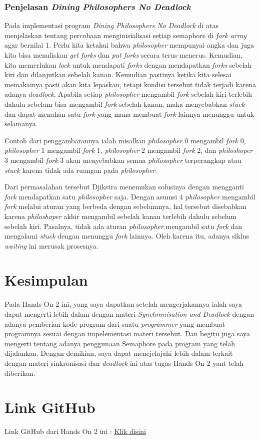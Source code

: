 \documentclass[11pt,a4paper]{article}
\begin{document}
\subsubsection{Penjelasan \textit{Dining Philosophers No Deadlock}}
Pada implementasi program \textit{Dining Philosophers No Deadlock} di atas menjelaskan tentang percobaan menginisialisasi setiap semaphore di \textit{fork array} agar bernilai 1.
Perlu kita ketahui bahwa \textit{philosopher} mempunyai angka dan juga kita bisa menuliskan \textit{get forks} dan \textit{put forks} secara terus-menerus. Kemudian, kita memerlukan 
\textit{lock} untuk mendapati \textit{forks} dengan mendapatkan \textit{forks} sebelah kiri dan dilanjutkan sebelah kanan. Kemudian pastinya ketika kita selesai memakainya pasti akan kita 
lepaskan, tetapi kondisi tersebut tidak terjadi karena adanya \textit{deadlock}. Apabila setiap \textit{philosopher} mengambil \textit{fork} sebelah kiri terlebih dahulu sebelum bisa mengambil 
\textit{fork} sebelah kanan, maka menyebabkan \textit{stuck} dan dapat menahan satu \textit{fork} yang mana membuat \textit{fork} lainnya menunggu untuk selamanya. \par
Contoh dari penggambarannya ialah misalkan \textit{philosopher} 0 mengambil \textit{fork} 0, \textit{philosopher} 1 mengambil \textit{fork} 1, \textit{philosopher} 2 mengambil \textit{fork} 2, dan 
\textit{philoshoper} 3 mengambil \textit{fork} 3 akan menyebabkan semua \textit{philosopher} terperangkap atau \textit{stuck} karena tidak ada ruangan pada \textit{philosopher}. \par
Dari permasalahan tersebut Djikstra menemukan solusinya dengan mengganti \textit{fork} mendapatkan satu \textit{philosopher} saja. Dengan asumsi 4 \textit{philosopher} mengambil \textit{fork} melalui 
aturan yang berbeda dengan sebelumnya, hal tersebut disebabkan karena \textit{philoshoper} akhir mengambil sebelah kanan terlebih dahulu sebelum sebelah kiri. Pasalnya, tidak ada aturan \textit{philosopher} 
mengambil satu \textit{fork} dan mengalami \textit{stuck} dengan menunggu \textit{fork} lainnya. Oleh karena itu, adanya siklus \textit{waiting} ini merusak prosesnya.

\newpage
\section{Kesimpulan}
	Pada Hands On 2 ini, yang saya dapatkan setelah mengerjakannya ialah saya dapat mengerti lebih dalam dengan materi 
	\textit{Synchronisation and Deadlock} dengan adanya pemberian kode program dari suatu \textit{programmer} yang membuat 
	programnya sesuai dengan impelementasi materi tersebut. Dan begitu juga saya mengerti tentang adanya penggunaan Semaphore 
	pada program yang telah dijalankan. Dengan demikian, saya dapat menejelajahi lebih dalam terkait dengan materi sinkronisasi 
	dan \textit{deadlock} ini atas tugas Hands On 2 yant telah diberikan.
		
\section{Link GitHub}
	Link GitHub dari Hands On 2 ini : \href{https://github.com/BilhaqAD07/Sistem-Operasi.git}{Klik disini}


\newpage


\end{document}
